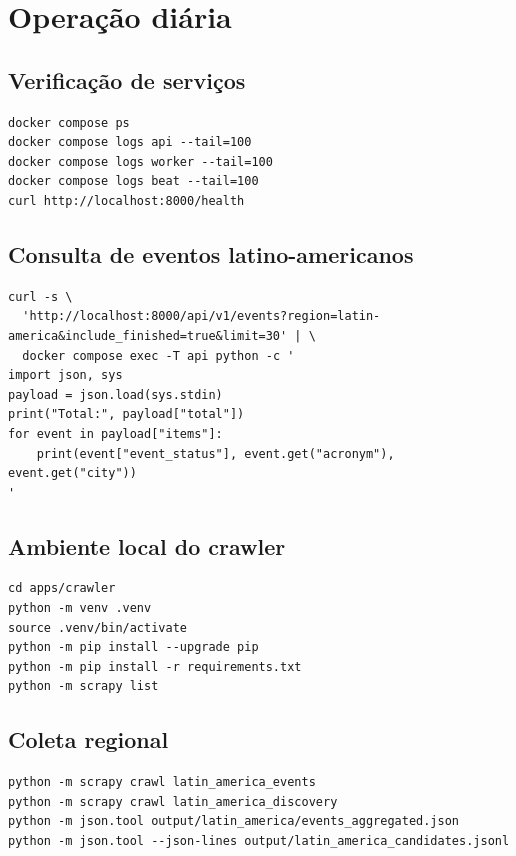 \chapter{Operação diária}

\section{Verificação de serviços}

\begin{lstlisting}
docker compose ps
docker compose logs api --tail=100
docker compose logs worker --tail=100
docker compose logs beat --tail=100
curl http://localhost:8000/health
\end{lstlisting}

\section{Consulta de eventos latino-americanos}

\begin{lstlisting}
curl -s \
  'http://localhost:8000/api/v1/events?region=latin-america&include_finished=true&limit=30' | \
  docker compose exec -T api python -c '
import json, sys
payload = json.load(sys.stdin)
print("Total:", payload["total"])
for event in payload["items"]:
    print(event["event_status"], event.get("acronym"), event.get("city"))
'
\end{lstlisting}

\section{Ambiente local do crawler}

\begin{lstlisting}
cd apps/crawler
python -m venv .venv
source .venv/bin/activate
python -m pip install --upgrade pip
python -m pip install -r requirements.txt
python -m scrapy list
\end{lstlisting}

\section{Coleta regional}

\begin{lstlisting}
python -m scrapy crawl latin_america_events
python -m scrapy crawl latin_america_discovery
python -m json.tool output/latin_america/events_aggregated.json
python -m json.tool --json-lines output/latin_america_candidates.jsonl
\end{lstlisting}
